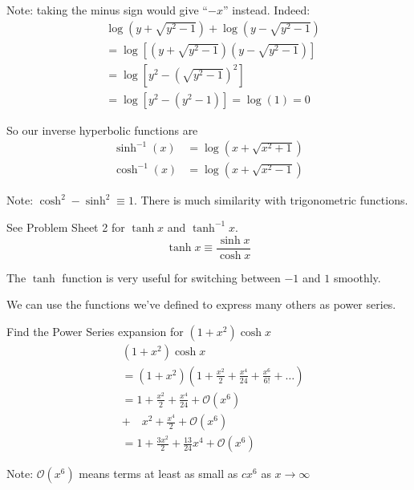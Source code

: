 \documentclass[10pt]{scrartcl}
\begin{document}
Note: taking the minus sign would give ``$-x$'' instead. Indeed: 
\[\begin{aligned}
  &\log(y + \sqrt{y^2-1}) +\log(y - \sqrt{y^2-1})\\
  &= \log[(y + \sqrt{y^2-1})(y - \sqrt{y^2-1})]\\
  &= \log[y^2 - (\sqrt{y^2-1})^2]\\
  &= \log[y^2 - (y^2 - 1)] = \log(1) = 0
\end{aligned}
\]

So our inverse hyperbolic functions are 
\[
\begin{aligned}
  \sinh^{-1}(x) &= \log(x + \sqrt{x^2 + 1})\\
  \cosh^{-1}(x) &= \log(x + \sqrt{x^2 - 1})
\end{aligned}
\]

Note: $\cosh^2 - \sinh^2 \equiv 1$. There is much similarity with trigonometric functions. 

See Problem Sheet 2 for $\tanh x$ and $\tanh^{-1}x$.  
\[\tanh x \equiv \frac{\sinh x}{\cosh x}\]

  \begin{center}
\end{center}

The $\tanh$ function is very useful for switching between $-1$ and $1$ smoothly.
\pagebreak 


We can use the functions we've defined to express many others as power series.\\
\begin{example}
Find the Power Series expansion for $(1+x^2)\cosh x$
\[
\begin{aligned}
  &(1+x^2)\cosh x\\
  &= (1+x^2)\left(1 + \frac{x^2}{2} + \frac{x^4}{24} + \frac{x^6}{6!} + \dots \right)\\
  &= 1 + \frac{x^2}{2} + \frac{x^4}{24} + \mathcal{O}(x^6)\\
  &+ \quad x^2 + \frac{x^4}{2} + \mathcal{O}(x^6)\\
  &= 1 + \frac{3x^2}{2} + \frac{13}{24}x^4 + \mathcal{O}(x^6)
\end{aligned}
\]

Note: $\mathcal{O}(x^6)$ means terms at least as small as $cx^6$ as $x\to \infty$

\end{example}\vspace*{10pt}
\end{document}
